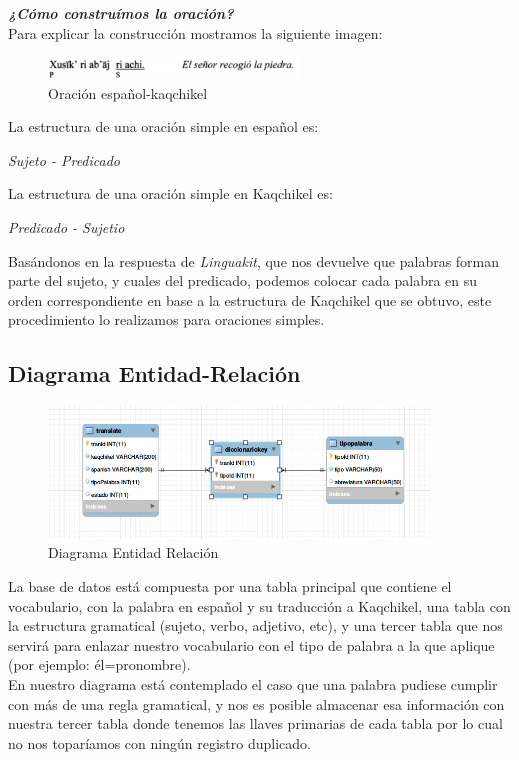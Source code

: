 \documentclass[a4paper,openright,11pt]{article}
\begin{document}
\textit{\textbf{¿Cómo construímos la oración?}}\\
Para explicar la construcción mostramos la siguiente imagen:\\
\begin{figure}[H]
	\centering
	\includegraphics[width=0.6\textwidth]{oracion}
	\caption{Oración español-kaqchikel}
	\label{fig:kaq}
\end{figure}
La estructura de una oración simple en español es:
\begin{center}
	\textit{Sujeto - Predicado}\\
\end{center}

La estructura de una oración simple en Kaqchikel es:
\begin{center}
	\textit{Predicado - Sujetio}\\
\end{center}

Basándonos en la respuesta de \textit{Linguakit}, que nos devuelve que palabras forman parte del sujeto, y cuales del predicado, podemos colocar cada palabra en su orden correspondiente en base a la estructura de Kaqchikel que se obtuvo, este procedimiento lo realizamos para oraciones simples.

\subsection{Diagrama Entidad-Relación}
\begin{figure}[h]
	\centering
	\includegraphics[width=0.9\textwidth]{er}
	\caption{Diagrama Entidad Relación}
	\label{fig:er}
\end{figure}
La base de datos está compuesta por una tabla principal que contiene el vocabulario, con la palabra en español y su traducción a Kaqchikel, una tabla con la estructura gramatical (sujeto, verbo, adjetivo, etc), y una tercer tabla que nos servirá para enlazar nuestro vocabulario con el tipo de palabra a la que aplique (por ejemplo: él=pronombre).\\
En nuestro diagrama está contemplado el caso que una palabra pudiese cumplir con más de una regla gramatical, y nos es posible almacenar esa información con nuestra tercer tabla donde tenemos las llaves primarias de cada tabla por lo cual no nos toparíamos con ningún registro duplicado.
\end{document}
